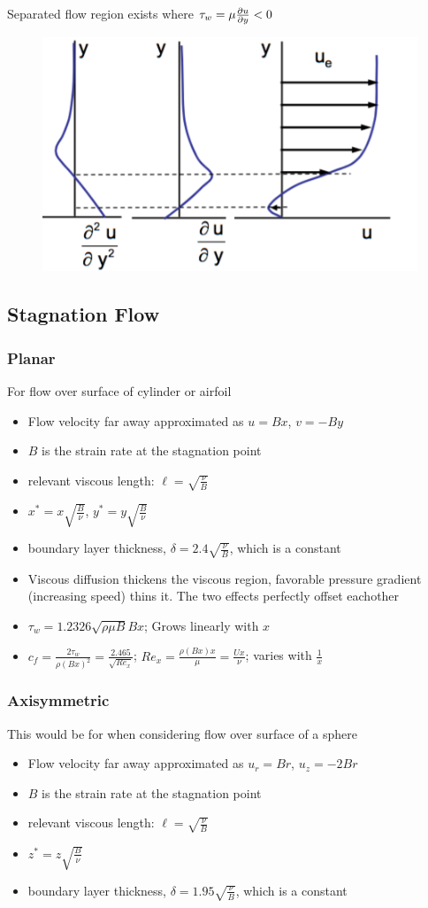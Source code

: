 \documentclass[a4paper]{article}
\begin{document}
    Separated flow region exists where $\tau_w = \mu \frac{\partial u}{\partial y} < 0$
    \begin{figure}[H]
        \centering
        \includegraphics[width=.5\textwidth]{images/seperation_adverse3_pg.png}
    \end{figure}
    \subsection{Stagnation Flow}
    \subsubsection{Planar}
    For flow over surface of cylinder or airfoil
    \begin{itemize}
        \item Flow velocity far away approximated as $u = Bx$, $v = -By$
        \item $B$ is the strain rate at the stagnation point
        \item relevant viscous length: $\ell = \sqrt{\frac{\nu}{B}}$
        \item $x^* = x \sqrt{\frac{B}{\nu}}$, $y^* = y \sqrt{\frac{B}{\nu}}$
        \item boundary layer thickness, $\delta = 2.4 \sqrt{\frac{\nu}{B}}$, which is a constant
        \item Viscous diffusion thickens the viscous region, favorable pressure gradient (increasing speed) thins it. The two effects perfectly offset eachother
        \item $\tau_w = 1.2326 \sqrt{\rho \mu B} B x$; Grows linearly with $x$
        \item $c_f = \frac{2 \tau_w}{\rho \left( B x \right)^2}= \frac{2.465}{\sqrt{Re_x}}$; $Re_x = \frac{\rho \left(B x\right) x}{\mu} = \frac
        {U x}{\nu}$; varies with $\frac{1}{x}$
    \end{itemize}
    \subsubsection{Axisymmetric}
    This would be for when considering flow over surface of a sphere
    \begin{itemize}
        \item Flow velocity far away approximated as $u_r = Br$, $u_z = -2Br$
        \item $B$ is the strain rate at the stagnation point
        \item relevant viscous length: $\ell = \sqrt{\frac{\nu}{B}}$
        \item $z^* = z \sqrt{\frac{B}{\nu}}$
        \item boundary layer thickness, $\delta = 1.95 \sqrt{\frac{\nu}{B}}$, which is a constant
    \end{itemize}
\end{document}
